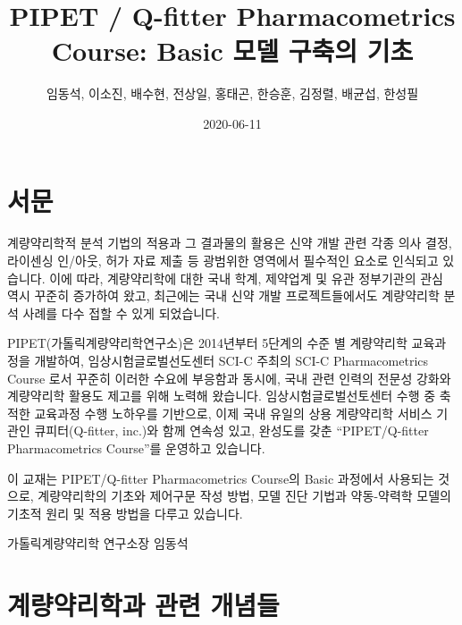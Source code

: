 \documentclass[
  10pt,
  krantz2,
  a4paper]{krantz}
\title{PIPET / Q-fitter Pharmacometrics Course: Basic 모델 구축의 기초}
\author{임동석, 이소진, 배수현, 전상일, 홍태곤, 한승훈, 김정렬, 배균섭, 한성필}
\date{2020-06-11}
\theoremstyle{definition}
\theoremstyle{definition}
\theoremstyle{definition}
\theoremstyle{remark}
\begin{document}
\maketitle

\thispagestyle{empty}
\begin{center}
\end{center}

\setlength{\abovedisplayskip}{-5pt}
\setlength{\abovedisplayshortskip}{-5pt}

{
\hypersetup{linkcolor=}
\setcounter{tocdepth}{2}
\tableofcontents
}
\listoftables
\listoffigures
{}
\hypertarget{uxc11cuxbb38}{%
\chapter*{서문}\label{uxc11cuxbb38}}


계량약리학적 분석 기법의 적용과 그 결과물의 활용은 신약 개발 관련 각종 의사 결정, 라이센싱 인/아웃, 허가 자료 제출 등 광범위한 영역에서 필수적인 요소로 인식되고 있습니다. 이에 따라, 계량약리학에 대한 국내 학계, 제약업계 및 유관 정부기관의 관심 역시 꾸준히 증가하여 왔고, 최근에는 국내 신약 개발 프로젝트들에서도 계량약리학 분석 사례를 다수 접할 수 있게 되었습니다.

PIPET(가톨릭계량약리학연구소)은 2014년부터 5단계의 수준 별 계량약리학 교육과정을 개발하여, 임상시험글로벌선도센터 SCI-C 주최의 SCI-C Pharmacometrics Course 로서 꾸준히 이러한 수요에 부응함과 동시에, 국내 관련 인력의 전문성 강화와 계량약리학 활용도 제고를 위해 노력해 왔습니다. 임상시험글로벌선토센터 수행 중 축적한 교육과정 수행 노하우를 기반으로, 이제 국내 유일의 상용 계량약리학 서비스 기관인 큐피터(Q-fitter, inc.)와 함께 연속성 있고, 완성도를 갖춘 ``PIPET/Q-fitter Pharmacometrics Course''를 운영하고 있습니다.

이 교재는 PIPET/Q-fitter Pharmacometrics Course의 Basic 과정에서 사용되는 것으로, 계량약리학의 기초와 제어구문 작성 방법, 모델 진단 기법과 약동-약력학 모델의 기초적 원리 및 적용 방법을 다루고 있습니다.

가톨릭계량약리학 연구소장 \hfill 임동석

\mainmatter

\hypertarget{intro}{%
\chapter{계량약리학과 관련 개념들}\label{intro}}
\end{document}

